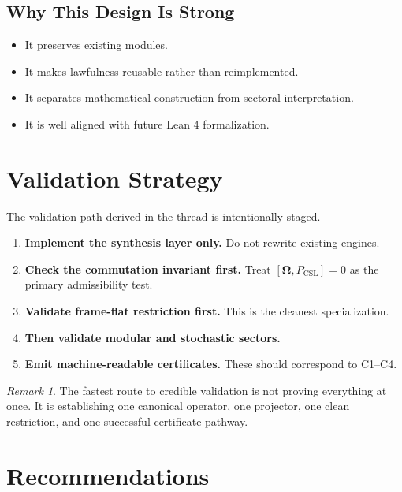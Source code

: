 \documentclass[11pt]{article}
\theoremstyle{plain}
\theoremstyle{definition}
\theoremstyle{remark}
\newtheorem{remark}[theorem]{Remark}
\newcommand{\Om}{\boldsymbol{\Omega}}
\newcommand{\PCSL}{P_{\mathrm{CSL}}}
\begin{document}
\subsection{Why This Design Is Strong}

\begin{itemize}
    \item It preserves existing modules.
    \item It makes lawfulness reusable rather than reimplemented.
    \item It separates mathematical construction from sectoral interpretation.
    \item It is well aligned with future Lean 4 formalization.
\end{itemize}

\section{Validation Strategy}

The validation path derived in the thread is intentionally staged.

\begin{enumerate}
    \item \textbf{Implement the synthesis layer only.} Do not rewrite existing engines.
    \item \textbf{Check the commutation invariant first.} Treat \([\Om,\PCSL]=0\) as the primary admissibility test.
    \item \textbf{Validate frame-flat restriction first.} This is the cleanest specialization.
    \item \textbf{Then validate modular and stochastic sectors.}
    \item \textbf{Emit machine-readable certificates.} These should correspond to C1--C4.
\end{enumerate}

\begin{remark}
The fastest route to credible validation is not proving everything at once. It is establishing one canonical operator, one projector, one clean restriction, and one successful certificate pathway.
\end{remark}

\section{Recommendations}
\end{document}
